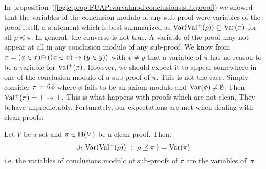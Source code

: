 In
proposition~(\ref{logic:prop:FUAP:varvalmod:conclusions:sub:proof})
we showed that the variables of the conclusion modulo of any
sub-proof were variables of the proof itself, a statement which is
best summarized as $\mbox{\rm Var}(\mbox{$\rm Val^{+}$}(\rho))\subseteq\mbox{\rm Var}(\pi)$ for all
$\rho\preceq\pi$. In general, the converse is not true. A variable
of the proof may not appear at all in any conclusion modulo of any
sub-proof.  We know from $\pi=(x\in x)\mbox{$\oplus$}\,((x\in x)\to(y\in y))$
with $x\neq y$ that a variable of $\pi$ has no reason to be a
variable for $\mbox{$\rm Val^{+}$}(\pi)$. However, we should expect it to appear
somewhere in one of the conclusion modulo of a sub-proof of $\pi$.
This is not the case. Simply consider $\pi=\mbox{$\partial$}\phi$ where $\phi$
fails to be an axiom modulo and $\mbox{\rm Var}(\phi)\neq\emptyset$. Then
$\mbox{$\rm Val^{+}$}(\pi)=\bot\to\bot$. This is what happens with proofs which are
not clean. They behave unpredictably. Fortunately, our expectations
are met when dealing with clean proofs:
\begin{prop}\label{logic:prop:FUAP:varvalmod:conclusions:sub:proof:almost:clean}
Let $V$ be a set and $\pi\in\mbox{${\bf\Pi}(V)$}$ be a clean proof. Then:
    \begin{equation}\label{logic:eqn:FUAP:varvalmod:conclusions:almost:clean:1}
    \cup\{\,\mbox{\rm Var}(\mbox{$\rm Val^{+}$}(\rho))\ :\
    \rho\preceq\pi\,\}=\mbox{\rm Var}(\pi)
    \end{equation}
i.e. the variables of conclusions modulo of sub-proofs of $\pi$ are
the variables of~$\pi$.
\end{prop}
